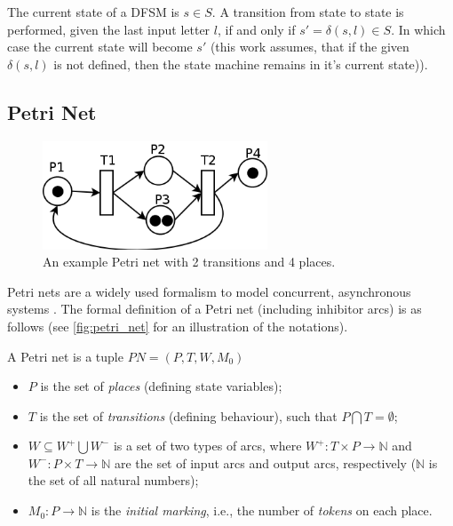 The current state of a DFSM is \(s \in S\). A transition from state to state is performed, given the last input letter \(l\), if and only if \( s' = \delta(s, l) \in S \). In which case the current state will become \(s'\) (this work assumes, that if the given \(\delta(s, l)\) is not defined, then the state machine remains in it's current state)).

\subsection{Petri Net}

\begin{figure}[!ht]
	\centering
	\includegraphics[width=67mm, keepaspectratio]{figures/petri_net.png}\hspace{1cm}
	\caption{An example Petri net with 2 transitions and 4 places.}
	\label{fig:petri_net}
\end{figure}

Petri nets are a widely used formalism to model concurrent, asynchronous systems \cite{24143}. The formal definition of a Petri net (including inhibitor arcs) is as follows (see \autoref{fig:petri_net} for an illustration of the notations).

\begin{definition}
	
	A Petri net is a tuple \( PN = (P, T, W, M_0) \)
	
	\begin{itemize}
		\item \(P\) is the set of \emph{places} (defining state variables);
		\item \(T\) is the set of \emph{transitions} (defining behaviour), such that \( P \bigcap T = \emptyset \);
		\item \(W \subseteq W^+ \bigcup W^- \) is a set of two types of arcs, where \(  W^+ : T \times P \rightarrow \mathbb{N}\) and \( W^- : P \times T \rightarrow \mathbb{N} \) are the set of input arcs and output arcs, respectively (\( \mathbb{N} \) is the set of all natural numbers);
		\item \(M_0 : P \rightarrow \mathbb{N} \) is the \emph{initial marking}, i.e., the number of \emph{tokens} on each place.
	\end{itemize}
\end{definition}

